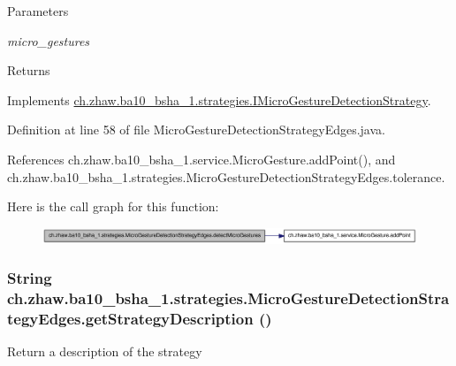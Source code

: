 \begin{DoxyParams}{Parameters}
\item[{\em micro\_\-gestures}]\end{DoxyParams}
\begin{DoxyReturn}{Returns}

\end{DoxyReturn}


Implements \hyperlink{interfacech_1_1zhaw_1_1ba10__bsha__1_1_1strategies_1_1IMicroGestureDetectionStrategy_a8593331fb67e5d4dc890d3db9f2d1b58}{ch.zhaw.ba10\_\-bsha\_\-1.strategies.IMicroGestureDetectionStrategy}.

Definition at line 58 of file MicroGestureDetectionStrategyEdges.java.

References ch.zhaw.ba10\_\-bsha\_\-1.service.MicroGesture.addPoint(), and ch.zhaw.ba10\_\-bsha\_\-1.strategies.MicroGestureDetectionStrategyEdges.tolerance.

Here is the call graph for this function:\nopagebreak
\begin{figure}[H]
\begin{center}
\leavevmode
\includegraphics[width=375pt]{classch_1_1zhaw_1_1ba10__bsha__1_1_1strategies_1_1MicroGestureDetectionStrategyEdges_a16cd0b9ef604ba14a7eb573a77966c4f_cgraph}
\end{center}
\end{figure}
\hypertarget{classch_1_1zhaw_1_1ba10__bsha__1_1_1strategies_1_1MicroGestureDetectionStrategyEdges_ae0338811d57c4b4b96705b71c5edfc43}{
\subsubsection[{getStrategyDescription}]{\setlength{\rightskip}{0pt plus 5cm}String ch.zhaw.ba10\_\-bsha\_\-1.strategies.MicroGestureDetectionStrategyEdges.getStrategyDescription ()}}
\label{classch_1_1zhaw_1_1ba10__bsha__1_1_1strategies_1_1MicroGestureDetectionStrategyEdges_ae0338811d57c4b4b96705b71c5edfc43}
Return a description of the strategy

